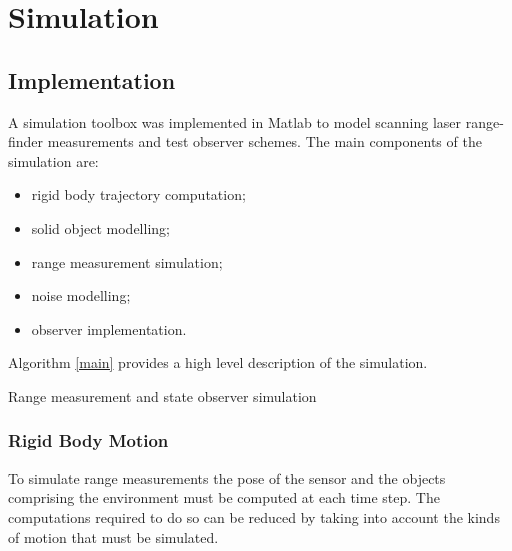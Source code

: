 \chapter{Simulation}
\section{Implementation}
A simulation toolbox was implemented in Matlab to model scanning laser range-finder measurements and test observer schemes. The main components of the simulation are:
\begin{itemize}
\item rigid body trajectory computation;
\item solid object modelling;
\item range measurement simulation;
\item noise modelling;
\item observer implementation.
\end{itemize}

Algorithm \ref{main} provides a high level description of the simulation.

\IncMargin{2em}
	\begin{algorithm}
	\DontPrintSemicolon
	\caption{Range measurement and state observer simulation} \label{main}
	\end{algorithm}

\subsection{Rigid Body Motion}
To simulate range measurements the pose of the sensor and the objects comprising the environment must be computed at each time step. The computations required to do so can be reduced by taking into account the kinds of motion that must be simulated.

